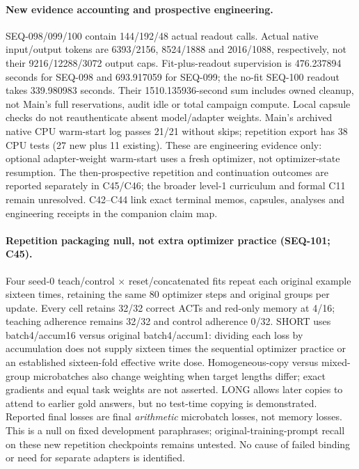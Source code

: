\documentclass{article}
\begin{document}
\paragraph{New evidence accounting and prospective engineering.} SEQ-098/099/100 contain 144/192/48 actual readout calls. Actual native input/output tokens are 6393/2156, 8524/1888 and 2016/1088, respectively, not their 9216/12288/3072 output caps. Fit-plus-readout supervision is 476.237894 seconds for SEQ-098 and 693.917059 for SEQ-099; the no-fit SEQ-100 readout takes 339.980983 seconds. Their 1510.135936-second sum includes owned cleanup, not Main's full reservations, audit idle or total campaign compute. Local capsule checks do not reauthenticate absent model/adapter weights. Main's archived native CPU warm-start log passes 21/21 without skips; repetition export has 38 CPU tests (27 new plus 11 existing). These are engineering evidence only: optional adapter-weight warm-start uses a fresh optimizer, not optimizer-state resumption. The then-prospective repetition and continuation outcomes are reported separately in C45/C46; the broader level-1 curriculum and formal C11 remain unresolved. C42--C44 link exact terminal memos, capsules, analyses and engineering receipts in the companion claim map.

\paragraph{Repetition packaging null, not extra optimizer practice (SEQ-101; C45).} Four seed-0 teach/control $\times$ reset/concatenated fits repeat each original example sixteen times, retaining the same 80 optimizer steps and original groups per update. Every cell retains 32/32 correct ACTs and red-only memory at 4/16; teaching adherence remains 32/32 and control adherence 0/32. SHORT uses batch4/accum16 versus original batch4/accum1: dividing each loss by accumulation does not supply sixteen times the sequential optimizer practice or an established sixteen-fold effective write dose. Homogeneous-copy versus mixed-group microbatches also change weighting when target lengths differ; exact gradients and equal task weights are not asserted. LONG allows later copies to attend to earlier gold answers, but no test-time copying is demonstrated. Reported final losses are final \emph{arithmetic} microbatch losses, not memory losses. This is a null on fixed development paraphrases; original-training-prompt recall on these new repetition checkpoints remains untested. No cause of failed binding or need for separate adapters is identified.
\end{document}
